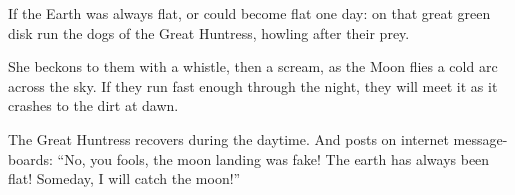 If the Earth was always flat, or could become flat one day: on that
great green disk run the dogs of the Great Huntress, howling after their
prey.

She beckons to them with a whistle, then a scream, as the Moon flies a
cold arc across the sky. If they run fast enough through the night, they
will meet it as it crashes to the dirt at dawn.

The Great Huntress recovers during the daytime. And posts on internet
message-boards: ``No, you fools, the moon landing was fake! The earth
has always been flat! Someday, I will catch the moon!''
